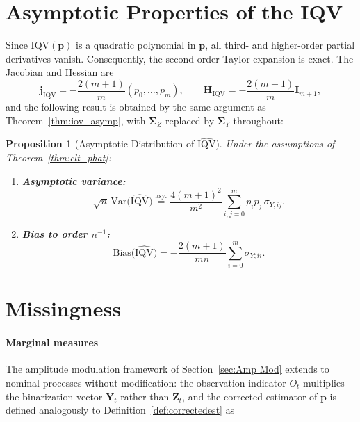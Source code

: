 ﻿\documentclass[12pt,a4paper]{scrreprt}
\newtheorem{proposition}[theorem]{Proposition}
\theoremstyle{definition}
\begin{document}
\section{Asymptotic Properties of the IQV}

Since $\mathrm{IQV}(\boldsymbol{p}) $ is a quadratic polynomial in $\boldsymbol{p}$, all
third- and higher-order partial derivatives vanish. Consequently, the
second-order Taylor expansion is exact. The Jacobian and Hessian are
\[
    \boldsymbol{j}_{\mathrm{IQV}}
    = -\frac{2(m+1)}{m}(p_0, \ldots, p_m),
    \qquad
    \boldsymbol{H}_{\mathrm{IQV}}
    = -\frac{2(m+1)}{m}\boldsymbol{I}_{m+1},
\]
and the following result is obtained by the same argument as
Theorem~\ref{thm:iov_asymp}, with $\boldsymbol{\Sigma}_Z$ replaced
by $\boldsymbol{\Sigma}_Y$ throughout:

\begin{proposition}[Asymptotic Distribution of $\widehat{\mathrm{IQV}}$]
\label{prop:iqv_asymp}
Under the assumptions of Theorem~\ref{thm:clt_phat}:
\begin{enumerate}
    \item[\normalfont(i)] \textbf{Asymptotic variance:}
    \[
        \sqrt{n}\,\mathrm{Var}\bigl(\widehat{\mathrm{IQV}}\bigr)
        \overset{\mathrm{asy.}}{=}
        \frac{4(m+1)^2}{m^2}
        \sum_{i,j=0}^{m} p_i p_j\,\sigma_{Y;ij}.
    \]
    \item[\normalfont(ii)] \textbf{Bias to order $n^{-1}$:}
    \[
        \mathrm{Bias}\bigl(\widehat{\mathrm{IQV}}\bigr)
        = -\frac{2(m+1)}{mn}\sum_{i=0}^{m}\sigma_{Y;ii}.
    \]
\end{enumerate}
\end{proposition}

\section{Missingness}
\paragraph{Marginal measures}
The amplitude modulation framework of Section~\ref{sec:Amp Mod} extends 
to nominal processes without modification: the observation indicator 
$O_t$ multiplies the binarization vector $\boldsymbol{Y}_t$ rather than 
$\boldsymbol{Z}_t$, and the corrected estimator of $\boldsymbol{p}$ is 
defined analogously to Definition~\ref{def:correctedest} as
\end{document}
